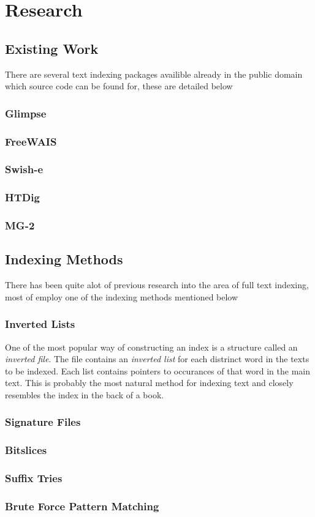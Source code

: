 \chapter {Research}

\section {Existing Work}
There are several text indexing packages availible already in the
public domain which source code can be found for, these are detailed
below

\subsection{Glimpse}

\subsection{FreeWAIS}

\subsection{Swish-e}

\subsection{HTDig}

\subsection{MG-2}


\section{Indexing Methods}
There has been quite alot of previous research into the area of full
text indexing, most of employ one of the indexing methods mentioned
below

\subsection{Inverted Lists}
One of the most popular way of constructing an index is a structure
called an \emph{inverted file}.  The file contains an \emph{inverted
  list} for each distrinct word in the texts to be indexed.  Each list
contains pointers to occurances of that word in the main text.  This
is probably the most natural method for indexing text and closely
resembles the index in the back of a book.

\subsection{Signature Files}

\subsection{Bitslices}

\subsection{Suffix Tries}

\subsection{Brute Force Pattern Matching}

